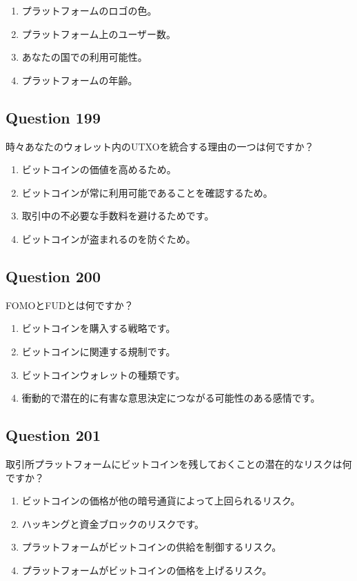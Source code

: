 \documentclass[12pt,a4paper]{article}
\begin{document}
\begin{enumerate}[label=\Alph*., leftmargin=*]
\item プラットフォームのロゴの色。
\item プラットフォーム上のユーザー数。
\item あなたの国での利用可能性。
\item プラットフォームの年齢。
\end{enumerate}

\bigskip


\subsection*{Question 199}
時々あなたのウォレット内のUTXOを統合する理由の一つは何ですか？

\begin{enumerate}[label=\Alph*., leftmargin=*]
\item ビットコインの価値を高めるため。
\item ビットコインが常に利用可能であることを確認するため。
\item 取引中の不必要な手数料を避けるためです。
\item ビットコインが盗まれるのを防ぐため。
\end{enumerate}

\bigskip


\subsection*{Question 200}
FOMOとFUDとは何ですか？

\begin{enumerate}[label=\Alph*., leftmargin=*]
\item ビットコインを購入する戦略です。
\item ビットコインに関連する規制です。
\item ビットコインウォレットの種類です。
\item 衝動的で潜在的に有害な意思決定につながる可能性のある感情です。
\end{enumerate}

\bigskip


\subsection*{Question 201}
取引所プラットフォームにビットコインを残しておくことの潜在的なリスクは何ですか？

\begin{enumerate}[label=\Alph*., leftmargin=*]
\item ビットコインの価格が他の暗号通貨によって上回られるリスク。
\item ハッキングと資金ブロックのリスクです。
\item プラットフォームがビットコインの供給を制御するリスク。
\item プラットフォームがビットコインの価格を上げるリスク。
\end{enumerate}
\end{document}
